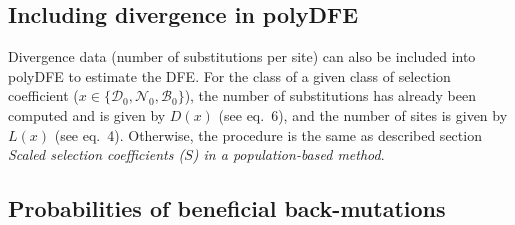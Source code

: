 \documentclass{article}
\newcommand{\SphyDel}{\mathcal{D}_0}
\newcommand{\SphyNeu}{\mathcal{N}_0}
\newcommand{\SphyBen}{\mathcal{B}_0}
\newcommand{\Sphyclass}{x}
\newcommand{\Spop}{S}
\begin{document}
    \subsection{Including divergence in polyDFE}
    Divergence data (number of substitutions per site) can also be included into polyDFE to estimate the DFE.
    For the class of a given class of selection coefficient ($\Sphyclass \in \{\SphyDel, \SphyNeu, \SphyBen \}$), the number of substitutions has already been computed and is given by $D\left( \Sphyclass \right)$ (see eq.~6), and the number of sites is given by $L \left( \Sphyclass \right)$ (see eq.~4).
    Otherwise, the procedure is the same as described section \textit{Scaled selection coefficients ($\Spop$) in a population-based method}.

    \subsection{Probabilities of beneficial back-mutations}
\end{document}
